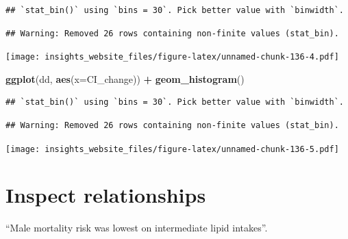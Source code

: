 \documentclass[]{book}
\newenvironment{Shaded}{\begin{snugshade}}{\end{snugshade}}
\newcommand{\DataTypeTok}[1]{\textcolor[rgb]{0.13,0.29,0.53}{#1}}
\newcommand{\DecValTok}[1]{\textcolor[rgb]{0.00,0.00,0.81}{#1}}
\newcommand{\KeywordTok}[1]{\textcolor[rgb]{0.13,0.29,0.53}{\textbf{#1}}}
\newcommand{\NormalTok}[1]{#1}
\newcommand{\OperatorTok}[1]{\textcolor[rgb]{0.81,0.36,0.00}{\textbf{#1}}}
\newcommand{\StringTok}[1]{\textcolor[rgb]{0.31,0.60,0.02}{#1}}
\begin{document}
\begin{verbatim}
## `stat_bin()` using `bins = 30`. Pick better value with `binwidth`.
\end{verbatim}

\begin{verbatim}
## Warning: Removed 26 rows containing non-finite values (stat_bin).
\end{verbatim}

\texttt{[image: insights\_website\_files/figure-latex/unnamed-chunk-136-4.pdf]}

\begin{Shaded}
\begin{Highlighting}[]
\KeywordTok{ggplot}\NormalTok{(dd, }\KeywordTok{aes}\NormalTok{(}\DataTypeTok{x=}\NormalTok{CI_change)) }\OperatorTok{+}
\StringTok{  }\KeywordTok{geom_histogram}\NormalTok{()}
\end{Highlighting}
\end{Shaded}

\begin{verbatim}
## `stat_bin()` using `bins = 30`. Pick better value with `binwidth`.
\end{verbatim}

\begin{verbatim}
## Warning: Removed 26 rows containing non-finite values (stat_bin).
\end{verbatim}

\texttt{[image: insights\_website\_files/figure-latex/unnamed-chunk-136-5.pdf]}

\begin{Shaded}
\end{Shaded}

\hypertarget{inspect-relationships}{%
\section{Inspect relationships}\label{inspect-relationships}}

``Male mortality risk was lowest on intermediate lipid intakes''.
\end{document}
